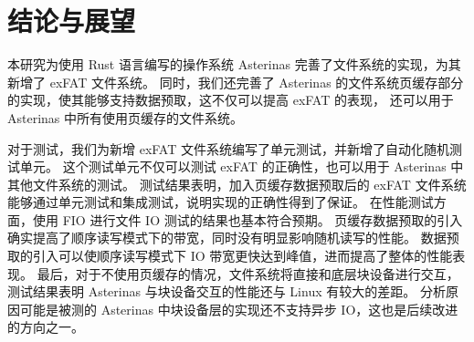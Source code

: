 
\chapter{结论与展望}
本研究为使用 Rust 语言编写的操作系统 Asterinas 完善了文件系统的实现，为其新增了 exFAT 文件系统。
同时，我们还完善了 Asterinas 的文件系统页缓存部分的实现，使其能够支持数据预取，这不仅可以提高 exFAT 的表现，
还可以用于 Asterinas 中所有使用页缓存的文件系统。

对于测试，我们为新增 exFAT 文件系统编写了单元测试，并新增了自动化随机测试单元。
这个测试单元不仅可以测试 exFAT 的正确性，也可以用于 Asterinas 中其他文件系统的测试。
测试结果表明，加入页缓存数据预取后的 exFAT 文件系统能够通过单元测试和集成测试，说明实现的正确性得到了保证。
在性能测试方面，使用 FIO 进行文件 IO 测试的结果也基本符合预期。
页缓存数据预取的引入确实提高了顺序读写模式下的带宽，同时没有明显影响随机读写的性能。
数据预取的引入可以使顺序读写模式下 IO 带宽更快达到峰值，进而提高了整体的性能表现。
最后，对于不使用页缓存的情况，文件系统将直接和底层块设备进行交互，测试结果表明 Asterinas 与块设备交互的性能还与 Linux 有较大的差距。
分析原因可能是被测的 Asterinas 中块设备层的实现还不支持异步 IO，这也是后续改进的方向之一。


